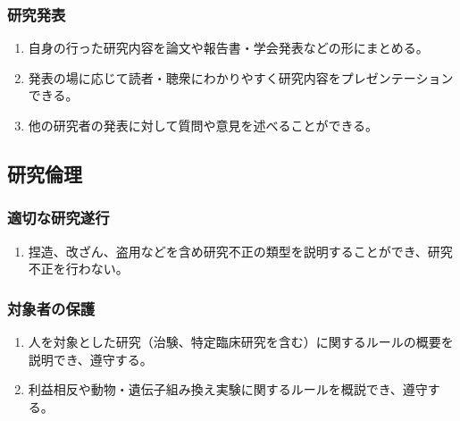 \hypertarget{ux7814ux7a76ux767aux8868}{%
\subsubsection{研究発表}\label{ux7814ux7a76ux767aux8868}}

\begin{enumerate}
\def\labelenumi{\arabic{enumi}.}
\tightlist
\item
  自身の行った研究内容を論文や報告書・学会発表などの形にまとめる。
\item
  発表の場に応じて読者・聴衆にわかりやすく研究内容をプレゼンテーションできる。
\item
  他の研究者の発表に対して質問や意見を述べることができる。
\end{enumerate}

\hypertarget{ux7814ux7a76ux502bux7406}{%
\subsection{研究倫理}\label{ux7814ux7a76ux502bux7406}}

\hypertarget{ux9069ux5207ux306aux7814ux7a76ux9042ux884c}{%
\subsubsection{適切な研究遂行}\label{ux9069ux5207ux306aux7814ux7a76ux9042ux884c}}

\begin{enumerate}
\def\labelenumi{\arabic{enumi}.}
\tightlist
\item
  捏造、改ざん、盗用などを含め研究不正の類型を説明することができ、研究不正を行わない。
\end{enumerate}

\hypertarget{ux5bfeux8c61ux8005ux306eux4fddux8b77}{%
\subsubsection{対象者の保護}\label{ux5bfeux8c61ux8005ux306eux4fddux8b77}}

\begin{enumerate}
\def\labelenumi{\arabic{enumi}.}
\tightlist
\item
  人を対象とした研究（治験、特定臨床研究を含む）に関するルールの概要を説明でき、遵守する。
\item
  利益相反や動物・遺伝子組み換え実験に関するルールを概説でき、遵守する。
\end{enumerate}

\newpage

